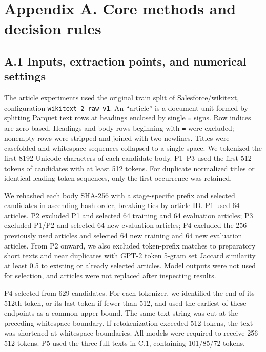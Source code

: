 \clearpage

\section{Appendix A. Core methods and decision rules}\label{appendix-a.-core-methods-and-decision-rules}

\FloatBarrier

\subsection{A.1 Inputs, extraction points, and numerical settings}\label{a.1-inputs-extraction-points-and-numerical-settings}

The article experiments used the original train split of Salesforce/wikitext, configuration \nolinkurl{wikitext-2-raw-v1}. An ``article'' is a document unit formed by splitting Parquet text rows at headings enclosed by single \nolinkurl{=} signs. Row indices are zero-based. Headings and body rows beginning with \nolinkurl{=} were excluded; nonempty rows were stripped and joined with two newlines. Titles were casefolded and whitespace sequences collapsed to a single space. We tokenized the first 8192 Unicode characters of each candidate body. P1--P3 used the first 512 tokens of candidates with at least 512 tokens. For duplicate normalized titles or identical leading token sequences, only the first occurrence was retained.

We rehashed each body SHA-256 with a stage-specific prefix and selected candidates in ascending hash order, breaking ties by article ID. P1 used 64 articles. P2 excluded P1 and selected 64 training and 64 evaluation articles; P3 excluded P1/P2 and selected 64 new evaluation articles; P4 excluded the 256 previously used articles and selected 64 new training and 64 new evaluation articles. From P2 onward, we also excluded token-prefix matches to preparatory short texts and near duplicates with GPT-2 token 5-gram set Jaccard similarity at least 0.5 to existing or already selected articles. Model outputs were not used for selection, and articles were not replaced after inspecting results.

P4 selected from 629 candidates. For each tokenizer, we identified the end of its 512th token, or its last token if fewer than 512, and used the earliest of these endpoints as a common upper bound. The same text string was cut at the preceding whitespace boundary. If retokenization exceeded 512 tokens, the text was shortened at whitespace boundaries. All models were required to receive 256--512 tokens. P5 used the three full texts in C.1, containing 101/85/72 tokens.

